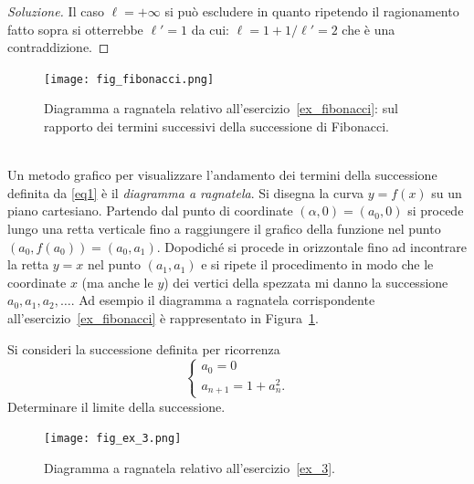 \begin{proof}[Soluzione]
    Il caso $\ell=+\infty$ si può escludere in quanto ripetendo il
    ragionamento fatto sopra si otterrebbe $\ell' = 1$ da cui:
    $\ell = 1 + 1/\ell' = 2$ che è una contraddizione.
\end{proof}
\newsavebox{\qrexfibonacci}
%
\begin{figure}
  \begin{center}
    \texttt{[image: fig\_fibonacci.png]}
  \end{center}
  \caption{Diagramma a ragnatela relativo
    all'esercizio~\ref{ex_fibonacci}:
    sul rapporto dei termini successivi della successione di Fibonacci.\\\\
    \usebox{\qrexfibonacci}%
    }
  \label{fig_fibonacci}
\end{figure}

Un metodo grafico per visualizzare l'andamento dei termini della
successione definita da \eqref{eq1} è il \emph{diagramma a
  ragnatela}. Si disegna la curva $y=f(x)$ su un piano
cartesiano. Partendo dal punto di coordinate $(\alpha, 0)=(a_0, 0)$ si procede
lungo una retta verticale fino a raggiungere il grafico della funzione
nel punto $(a_0, f(a_0)) = (a_0, a_1)$.
Dopodiché si procede in
orizzontale fino ad incontrare la retta $y=x$ nel punto $(a_1,a_1)$ e
si ripete il procedimento in modo che le coordinate $x$ (ma anche le $y$)
dei vertici della spezzata mi danno la successione $a_0, a_1, a_2,
\dots$. Ad esempio il diagramma a ragnatela corrispondente
all'esercizio~\ref{ex_fibonacci} è rappresentato in
Figura~\ref{fig_fibonacci}.

\begin{exercise}\label{ex_3}
  Si consideri la successione definita per ricorrenza
  \[
  \begin{cases}
    a_0 = 0\\
    a_{n+1} = 1 + a_n^2.
  \end{cases}
  \]
  Determinare il limite della successione.
\end{exercise}
\newsavebox{\qrextre}
\begin{figure}
  \begin{center}
    \texttt{[image: fig\_ex\_3.png]}
  \end{center}
  \caption{Diagramma a ragnatela relativo
    all'esercizio~\ref{ex_3}.
    \ifwidemargin\\\\\fi%
    \usebox{\qrextre}}
  \label{fig_ex_3}
\end{figure}

